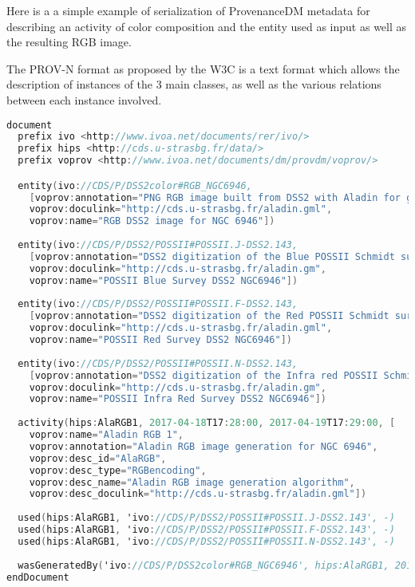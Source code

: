 Here is a a simple example of serialization of ProvenanceDM metadata for describing an activity of color composition and the entity used as input as well as the resulting RGB image. 

The PROV-N format \cite{std:PROV-N} as proposed by the W3C is a text format which allows the description of instances of the 3 main classes, as well as the various relations between each instance involved.

\begin{lstlisting}[language=C, style=customc,caption= PROV-N serialisation example for a color composition activity]
document
  prefix ivo <http://www.ivoa.net/documents/rer/ivo/>
  prefix hips <http://cds.u-strasbg.fr/data/>
  prefix voprov <http://www.ivoa.net/documents/dm/provdm/voprov/>

  entity(ivo://CDS/P/DSS2color#RGB_NGC6946, 
	[voprov:annotation="PNG RGB image built from DSS2 with Aladin for galaxy NGC 6946", 
	voprov:doculink="http://cds.u-strasbg.fr/aladin.gml", 
	voprov:name="RGB DSS2 image for NGC 6946"])
	
  entity(ivo://CDS/P/DSS2/POSSII#POSSII.J-DSS2.143, 
	[voprov:annotation="DSS2 digitization of the Blue POSSII Schmidt survey around  NGC 6946",
	voprov:doculink="http://cds.u-strasbg.fr/aladin.gm", 
	voprov:name="POSSII Blue Survey DSS2 NGC6946"])
	
  entity(ivo://CDS/P/DSS2/POSSII#POSSII.F-DSS2.143, 
	[voprov:annotation="DSS2 digitization of the Red POSSII Schmidt survey around NGC 6946",
	voprov:doculink="http://cds.u-strasbg.fr/aladin.gml", 
	voprov:name="POSSII Red Survey DSS2 NGC6946"])
	
  entity(ivo://CDS/P/DSS2/POSSII#POSSII.N-DSS2.143, 
	[voprov:annotation="DSS2 digitization of the Infra red POSSII Schmidt survey around NGC 6946",
	voprov:doculink="http://cds.u-strasbg.fr/aladin.gm", 
	voprov:name="POSSII Infra Red Survey DSS2 NGC6946"])
	
  activity(hips:AlaRGB1, 2017-04-18T17:28:00, 2017-04-19T17:29:00, [
	voprov:name="Aladin RGB 1", 
	voprov:annotation="Aladin RGB image generation for NGC 6946",
	voprov:desc_id="AlaRGB",
	voprov:desc_type="RGBencoding", 
	voprov:desc_name="Aladin RGB image generation algorithm", 	
	voprov:desc_doculink="http://cds.u-strasbg.fr/aladin.gml"])
	
  used(hips:AlaRGB1, 'ivo://CDS/P/DSS2/POSSII#POSSII.J-DSS2.143', -)
  used(hips:AlaRGB1, 'ivo://CDS/P/DSS2/POSSII#POSSII.F-DSS2.143', -)
  used(hips:AlaRGB1, 'ivo://CDS/P/DSS2/POSSII#POSSII.N-DSS2.143', -)
	
  wasGeneratedBy('ivo://CDS/P/DSS2color#RGB_NGC6946', hips:AlaRGB1, 2017-05-05T00:00:00)
endDocument
\end{lstlisting}

